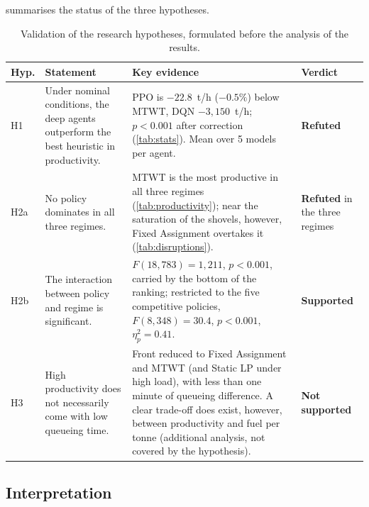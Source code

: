 \documentclass[11pt,a4paper]{article}
\newif\ifrevmarks
\newcommand{\revtag}[1]{\ifrevmarks\textsuperscript{\textcolor{red!70!black}{\scriptsize[#1]}}\fi}
\newcommand{\rev}[2]{\ifrevmarks{\color{revcolor}#2}\revtag{#1}\else#2\fi}
\newif\ifcorrmarks
\newcommand{\corr}[1]{\ifcorrmarks\textcolor{corrcolor}{#1}\else#1\fi}
\begin{document}
 summarises the status of the three hypotheses.

\begin{table}[H]
\caption{Validation of the research hypotheses, formulated before the analysis of the results.}
\label{tab:hypotheses}
\footnotesize\setlength{\tabcolsep}{4pt}
\begin{tabularx}{\textwidth}{@{}lXXl@{}}
\toprule
\textbf{Hyp.} & \textbf{Statement} & \textbf{Key evidence} & \textbf{Verdict} \\
\midrule
H1 & Under nominal conditions, the deep agents outperform the best heuristic in productivity. & \rev{T31}{PPO is $-22.8$~t/h ($-0.5\%$) below MTWT, DQN $-3{,}150$~t/h; $p<0.001$ after correction (\cref{tab:stats}). Mean over 5 models per agent.} & \rev{T31}{\textbf{Refuted}} \\[4pt]
\corr{H2a} & \corr{No policy dominates in all three regimes.} & \corr{MTWT is the most productive in all three regimes (\cref{tab:productivity}); near the saturation of the shovels, however, Fixed Assignment overtakes it (\cref{tab:disruptions}).} & \corr{\textbf{Refuted} in the three regimes} \\[4pt]
\corr{H2b} & \corr{The interaction between policy and regime is significant.} & \corr{$F(18,783)=1{,}211$, $p<0.001$, carried by the bottom of the ranking; restricted to the five competitive policies, $F(8,348)=30.4$, $p<0.001$, $\eta^2_p=0.41$.} & \corr{\textbf{Supported}} \\[4pt]
H3 & High productivity does not necessarily come with low queueing time. & \rev{T31}{Front reduced to Fixed Assignment and MTWT (and \corr{Static LP} under high load), with less than one minute of queueing difference. A clear trade-off does exist, however, between productivity and fuel per tonne (additional analysis, not covered by the hypothesis).} & \rev{T31}{\textbf{Not supported}} \\
\bottomrule
\end{tabularx}
\end{table}

\subsection{Interpretation}
\label{sec:interpretation}
\end{document}
